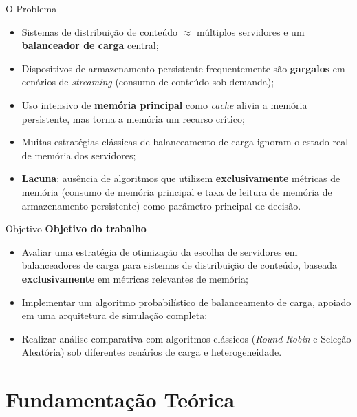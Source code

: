 \documentclass[10pt]{beamer}
\begin{document}
\begin{frame}{O Problema}
    \begin{itemize}
        \item Sistemas de distribuição de conteúdo $\approx$ múltiplos servidores e um \textbf{balanceador de carga} central;
        \item Dispositivos de armazenamento persistente frequentemente são \textbf{gargalos} em cenários de \textit{streaming} (consumo de conteúdo sob demanda);
        \item Uso intensivo de \textbf{memória principal} como \textit{cache} alivia a memória persistente, mas torna a memória um recurso crítico;
        \item Muitas estratégias clássicas de balanceamento de carga ignoram o estado real de memória dos servidores;
        \item \textbf{Lacuna}: ausência de algoritmos que utilizem \textbf{exclusivamente} métricas de memória (consumo de memória principal e taxa de leitura de memória de armazenamento persistente) como parâmetro principal de decisão.
    \end{itemize}
\end{frame}

\begin{frame}{Objetivo}
    \textbf{Objetivo do trabalho}
    \begin{itemize}
        \item Avaliar uma estratégia de otimização da escolha de servidores em balanceadores de carga para sistemas de distribuição de conteúdo, baseada \textbf{exclusivamente} em métricas relevantes de memória;
        \item Implementar um algoritmo probabilístico de balanceamento de carga, apoiado em uma arquitetura de simulação completa;
        \item Realizar análise comparativa com algoritmos clássicos (\textit{Round-Robin} e Seleção Aleatória) sob diferentes cenários de carga e heterogeneidade.
    \end{itemize}
\end{frame}


\section{Fundamentação Teórica}
\end{document}
